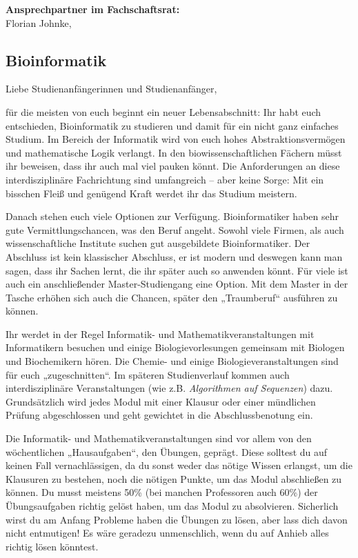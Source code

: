 \textbf{Ansprechpartner im Fachschaftsrat:}\\
Florian Johnke, \\

\newpage

\subsection{Bioinformatik}
\label{studiengang_bioinformatik}


Liebe Studienanfängerinnen und Studienanfänger,\par
für die meisten von euch beginnt ein neuer Lebensabschnitt:
Ihr habt euch entschieden, Bioinformatik zu studieren und damit für ein nicht ganz einfaches Studium.
Im Bereich der Informatik wird von euch hohes Abstraktionsvermögen und mathematische Logik verlangt.
In den biowissenschaftlichen Fächern müsst ihr beweisen, dass ihr auch mal viel pauken könnt.
Die Anforderungen an diese interdisziplinäre Fachrichtung sind umfangreich – aber keine Sorge:
Mit ein bisschen Fleiß und genügend Kraft werdet ihr das Studium meistern.

Danach stehen euch viele Optionen zur Verfügung.
Bioinformatiker haben sehr gute Vermittlungschancen, was den Beruf angeht.
Sowohl viele Firmen, als auch wissenschaftliche Institute suchen gut ausgebildete Bioinformatiker.
Der Abschluss ist kein klassischer Abschluss, er ist modern und deswegen kann man sagen, dass ihr Sachen lernt, die ihr später auch so anwenden könnt.
Für viele ist auch ein anschließender Master-Studiengang eine Option.
Mit dem Master in der Tasche erhöhen sich auch die Chancen, später den „Traumberuf“ ausführen zu können.

Ihr werdet in der Regel Informatik- und Mathematikveranstaltungen mit Informatikern besuchen und einige Biologievorlesungen gemeinsam mit Biologen und Biochemikern hören.
Die Chemie- und einige Biologieveranstaltungen sind für euch „zugeschnitten“.
Im späteren Studienverlauf kommen auch interdisziplinäre Veranstaltungen (wie z.B. \textit{Algorithmen auf Sequenzen}) dazu.
Grundsätzlich wird jedes Modul mit einer Klausur oder einer mündlichen Prüfung abgeschlossen und geht gewichtet in die Abschlussbenotung ein.

Die Informatik- und Mathematikveranstaltungen sind vor allem von den wöchent\-lichen „Hausaufgaben“, den Übungen, geprägt.
Diese solltest du auf keinen Fall vernachlässigen, da du sonst weder das nötige Wissen erlangst, um die Klausuren zu bestehen, noch die nötigen Punkte, um das Modul abschließen zu können.
Du musst meistens 50\% (bei manchen Professoren auch 60\%) der Übungsaufgaben richtig gelöst haben, um das Modul zu absolvieren.
Sicherlich wirst du am Anfang Probleme haben die Übungen zu lösen, aber lass dich davon nicht entmutigen!
Es wäre geradezu unmenschlich, wenn du auf Anhieb alles richtig lösen könntest.

